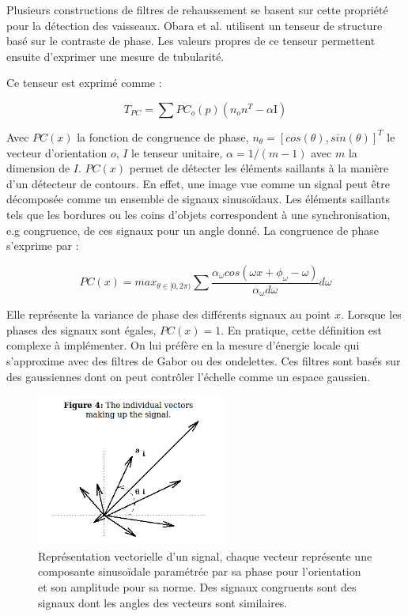 Plusieurs constructions de filtres de rehaussement se basent sur cette propriété pour la détection des vaisseaux. Obara et al. \cite{Obara2012_phase} utilisent un tenseur de structure basé sur le contraste de phase. Les valeurs propres de ce tenseur permettent ensuite d'exprimer une mesure de tubularité.

Ce tenseur est exprimé comme :

\begin{equation}
  T_{PC} = \sum PC_{o}(p)(n_{o}n^T - \alpha \text{I})
\end{equation}

Avec $PC(x)$ la fonction de congruence de phase, $n_{\theta}=[cos(\theta),sin(\theta)]^T$ le vecteur d'orientation $o$, $I$ le tenseur unitaire, $\alpha = 1/(m-1)$ avec $m$ la dimension de $I$. $PC(x)$ permet de détecter les éléments saillants à la manière d'un détecteur de contours.
En effet, une image vue comme un signal peut être décomposée comme un ensemble de signaux sinusoïdaux. Les éléments saillants tels que les bordures ou les coins d'objets correspondent à une synchronisation, e.g congruence, de ces signaux pour un angle donné. La congruence de phase s'exprime par :

\begin{equation}
  PC(x) = max_{\theta \in [0,2\pi)} \sum  \frac{ \alpha_{\omega}cos(\omega x + \phi_{\omega} - \omega)  }{ \alpha_{\omega}d \omega } d \omega
\end{equation}

Elle représente la variance de phase des différents signaux au point $x$. Lorsque les phases des signaux sont égales, $PC(x)=1$.
En pratique, cette définition est complexe à implémenter. On lui préfère en la mesure d'énergie locale qui s'approxime avec des filtres de Gabor ou des ondelettes. Ces filtres sont basés sur des gaussiennes dont on peut contrôler l'échelle comme un espace gaussien.

\begin{figure}[h]
  \centering
  \includegraphics[height=5cm]{Images/PC_vectors.png}
  \caption{Représentation vectorielle d'un signal, chaque vecteur représente une composante sinusoïdale paramétrée par sa phase pour l'orientation et son amplitude pour sa norme. Des signaux congruents sont des signaux dont les angles des vecteurs sont similaires.}
  \label{fig:phase_congruency_vectors}
\end{figure}

